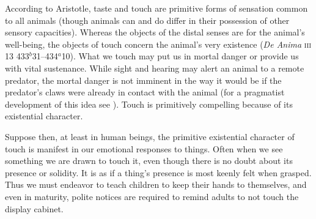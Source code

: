According to Aristotle, taste and touch are primitive forms of sensation common to all animals (though animals can and do differ in their possession of other sensory capacities). Whereas the objects of the distal senses are for the animal's well-being, the objects of touch concern the animal's very existence (\emph{De Anima} \textsc{iii} 13 433\( ^{b} \)31--434\( ^{a} \)10). What we touch may put us in mortal danger or provide us with vital sustenance. While sight and hearing may alert an animal to a remote predator, the mortal danger is not imminent in the way it would be if the predator's claws were already in contact with the animal (for a pragmatist development of this idea see \citealt[22--23]{Bergson:1912pi}). Touch is primitively compelling because of its existential character.

Suppose then, at least in human beings, the primitive existential character of touch is manifest in our emotional responses to things. Often when we see something we are drawn to touch it, even though there is no doubt about its presence or solidity. It is as if a thing's presence is most keenly felt when grasped. Thus we must endeavor to teach children to keep their hands to themselves, and even in maturity, polite notices are required to remind adults to not touch the display cabinet.

